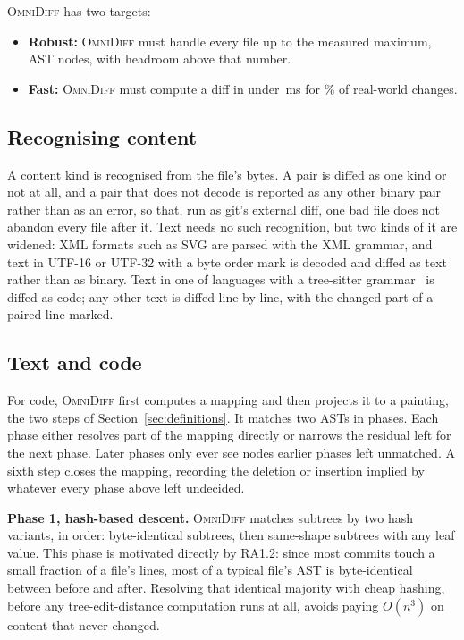 \documentclass[sigconf,review]{acmart}
\begin{document}
\textsc{OmniDiff} has two targets:

\begin{itemize}
  \item \textbf{Robust:} \textsc{OmniDiff} must handle every file up to the measured maximum,
    \AstMax{} AST nodes, with headroom above that number.
  \item \textbf{Fast:} \textsc{OmniDiff} must compute a diff in under \SpeedTargetMs{}\,ms for
    \SpeedTargetPct{}\% of real-world changes.
\end{itemize}

\subsection{Recognising content}
\label{sec:omnidiff-recognition}

A content kind is recognised from the file's bytes. A pair is diffed as one kind or not at all, and a pair that does not decode is reported as any
other binary pair rather than as an error, so that, run as git's external diff, one bad file does
not abandon every file after it. Text needs no such recognition, but two kinds of it are widened:
XML formats such as SVG are parsed with the XML grammar, and text in UTF-16 or UTF-32 with a byte
order mark is decoded and diffed as text rather than as binary. Text in one of
\NumSupportedLanguages{} languages with a tree-sitter grammar~\cite{tree-sitter} is diffed as
code; any other text is diffed line by line, with the changed part of a paired line marked.

\subsection{Text and code}
\label{sec:omnidiff-code}

For code, \textsc{OmniDiff} first computes a mapping and then projects it to a painting, the two
steps of Section~\ref{sec:definitions}. It matches two ASTs in \NumPhasesWord{} phases. Each
phase either resolves part of the mapping directly or narrows the residual left for the next
phase. Later phases only ever see nodes earlier phases left unmatched. A sixth step closes the
mapping, recording the deletion or insertion implied by whatever every phase above left
undecided.

\textbf{Phase 1, hash-based descent.} \textsc{OmniDiff} matches subtrees by two hash variants, in
order: byte-identical subtrees, then same-shape subtrees with any leaf value. This phase is
motivated directly by RA1.2: since most commits touch a small fraction of a file's lines, most
of a typical file's AST is byte-identical between before and after. Resolving that identical
majority with cheap hashing, before any tree-edit-distance computation runs at all, avoids paying
$O(n^3)$ on content that never changed.
\end{document}
